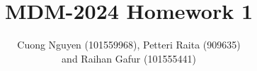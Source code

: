 \documentclass[a4paper,12pt]{article}
\title{MDM-2024 Homework 1}
\author{Cuong Nguyen (101559968), Petteri Raita (909635)\\and Raihan Gafur (101555441)}
\begin{document}
\maketitle
\tableofcontents
\newpage

\listoffigures
\newpage

% 
% 







% 
% 
% 

\printbibliography{}

%   
\end{document}
